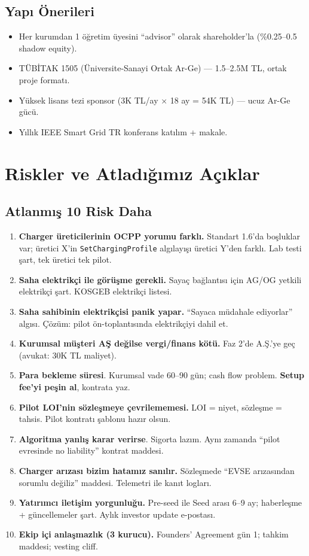 \documentclass[11pt,a4paper]{article}
\begin{document}
\subsection{Yapı Önerileri}
\begin{itemize}
    \item Her kurumdan 1 öğretim üyesini ``advisor'' olarak shareholder'la (\%0.25--0.5 shadow equity).
    \item TÜBİTAK 1505 (Üniversite-Sanayi Ortak Ar-Ge) --- 1.5--2.5M TL, ortak proje formatı.
    \item Yüksek lisans tezi sponsor (3K TL/ay × 18 ay = 54K TL) --- ucuz Ar-Ge gücü.
    \item Yıllık IEEE Smart Grid TR konferans katılım + makale.
\end{itemize}

\section{Riskler ve Atladığımız Açıklar}

\subsection{Atlanmış 10 Risk Daha}

\begin{enumerate}
    \item \textbf{Charger üreticilerinin OCPP yorumu farklı.} Standart 1.6'da boşluklar var; üretici X'in \texttt{SetChargingProfile} algılayışı üretici Y'den farklı. Lab testi şart, tek üretici tek pilot.
    \item \textbf{Saha elektrikçi ile görüşme gerekli.} Sayaç bağlantısı için AG/OG yetkili elektrikçi şart. KOSGEB elektrikçi listesi.
    \item \textbf{Saha sahibinin elektrikçisi panik yapar.} ``Sayaca müdahale ediyorlar'' algısı. Çözüm: pilot ön-toplantısında elektrikçiyi dahil et.
    \item \textbf{Kurumsal müşteri AŞ değilse vergi/finans kötü.} Faz 2'de A.Ş.'ye geç (avukat: 30K TL maliyet).
    \item \textbf{Para bekleme süresi}. Kurumsal vade 60--90 gün; cash flow problem. \textbf{Setup fee'yi peşin al}, kontrata yaz.
    \item \textbf{Pilot LOI'nin sözleşmeye çevrilememesi.} LOI = niyet, sözleşme = tahsis. Pilot kontratı şablonu hazır olsun.
    \item \textbf{Algoritma yanlış karar verirse}. Sigorta lazım. Aynı zamanda ``pilot evresinde no liability'' kontrat maddesi.
    \item \textbf{Charger arızası bizim hatamız sanılır.} Sözleşmede ``EVSE arızasından sorumlu değiliz'' maddesi. Telemetri ile kanıt logları.
    \item \textbf{Yatırımcı iletişim yorgunluğu.} Pre-seed ile Seed arası 6--9 ay; haberleşme + güncellemeler şart. Aylık investor update e-postası.
    \item \textbf{Ekip içi anlaşmazlık (3 kurucu).} Founders' Agreement gün 1; tahkim maddesi; vesting cliff.
\end{enumerate}
\end{document}
